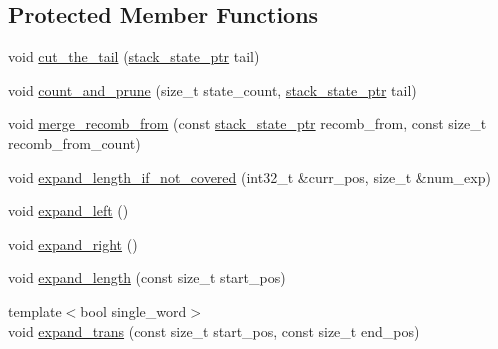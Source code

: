 \subsection*{Protected Member Functions}
\begin{DoxyCompactItemize}
\item 
void \hyperlink{classuva_1_1smt_1_1bpbd_1_1server_1_1decoder_1_1stack_1_1stack__state__templ_aa9706669ac078420a1a1abf945a01e14}{cut\+\_\+the\+\_\+tail} (\hyperlink{namespaceuva_1_1smt_1_1bpbd_1_1server_1_1decoder_1_1stack_ab08047a5fae45b1c4311bd5d5aa2c4fc}{stack\+\_\+state\+\_\+ptr} tail)
\item 
void \hyperlink{classuva_1_1smt_1_1bpbd_1_1server_1_1decoder_1_1stack_1_1stack__state__templ_a22d15d7a91a8c521b2f95aa6d264d1cf}{count\+\_\+and\+\_\+prune} (size\+\_\+t state\+\_\+count, \hyperlink{namespaceuva_1_1smt_1_1bpbd_1_1server_1_1decoder_1_1stack_ab08047a5fae45b1c4311bd5d5aa2c4fc}{stack\+\_\+state\+\_\+ptr} tail)
\item 
void \hyperlink{classuva_1_1smt_1_1bpbd_1_1server_1_1decoder_1_1stack_1_1stack__state__templ_a79dc499405a997bd8f6954b596a9b60c}{merge\+\_\+recomb\+\_\+from} (const \hyperlink{namespaceuva_1_1smt_1_1bpbd_1_1server_1_1decoder_1_1stack_ab08047a5fae45b1c4311bd5d5aa2c4fc}{stack\+\_\+state\+\_\+ptr} recomb\+\_\+from, const size\+\_\+t recomb\+\_\+from\+\_\+count)
\item 
void \hyperlink{classuva_1_1smt_1_1bpbd_1_1server_1_1decoder_1_1stack_1_1stack__state__templ_acc47f3e2f7ab44c6b9277a71ad85b997}{expand\+\_\+length\+\_\+if\+\_\+not\+\_\+covered} (int32\+\_\+t \&curr\+\_\+pos, size\+\_\+t \&num\+\_\+exp)
\item 
void \hyperlink{classuva_1_1smt_1_1bpbd_1_1server_1_1decoder_1_1stack_1_1stack__state__templ_a8fb3df4e1c15a5a465b35791f452a7d1}{expand\+\_\+left} ()
\item 
void \hyperlink{classuva_1_1smt_1_1bpbd_1_1server_1_1decoder_1_1stack_1_1stack__state__templ_a0e7a5745f23d9e7c725c519fe2561d5c}{expand\+\_\+right} ()
\item 
void \hyperlink{classuva_1_1smt_1_1bpbd_1_1server_1_1decoder_1_1stack_1_1stack__state__templ_aa690a85e73a64e611a596317cbc58365}{expand\+\_\+length} (const size\+\_\+t start\+\_\+pos)
\item 
{\footnotesize template$<$bool single\+\_\+word$>$ }\\void \hyperlink{classuva_1_1smt_1_1bpbd_1_1server_1_1decoder_1_1stack_1_1stack__state__templ_a1db06b42db2048b40f8c6e9d9e2b27fa}{expand\+\_\+trans} (const size\+\_\+t start\+\_\+pos, const size\+\_\+t end\+\_\+pos)
\end{DoxyCompactItemize}

